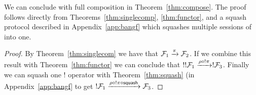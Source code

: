 %



We can conclude with full composition in Theorem~\ref{thm:compose}.
The proof follows directly from Theorems~\ref{thm:singlecomp}, \ref{thm:functor}, and a squash protocol described in Appendix~\ref{app:bangf} which squashes multiple sessions of \F into one. 

\begin{proof}
By Theorem~\ref{thm:singlecom} we have that $\mathcal{F}_1 \xrightarrow{\pi} \mathcal{F}_2$. If we combine this result with Theorem~\ref{thm:functor} we can conclude that $!!\mathcal{F}_1 \xrightarrow{\rho \circ !\pi} !\mathcal{F}_3$. 
Finally we can squash one $!$ operator with Theorem~\ref{thm:squash} (in Appendix~\ref{app:bangf} to get $!\mathcal{F}_1 \xrightarrow{\rho \circ !\pi \circ \mathsf{squash}} \mathcal{F}_3$.
\end{proof}


